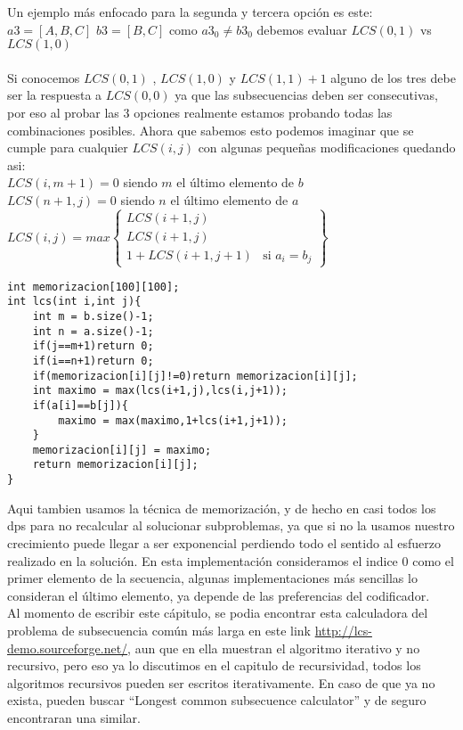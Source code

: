 Un ejemplo más enfocado para la segunda y tercera opción es este: $a3=[A,B,C]$ $b3=[B,C]$ como $a3_0 \neq b3_0$ debemos evaluar $LCS(0,1)$ vs $LCS(1,0)$
\\
\\Si conocemos $LCS(0,1)$ , $LCS(1,0)$ y $LCS(1,1) + 1$ alguno de los tres debe ser la respuesta a $LCS(0,0)$ ya que las subsecuencias deben ser consecutivas, por eso al probar las 3 opciones realmente estamos probando todas las combinaciones posibles. Ahora que sabemos esto podemos imaginar que se cumple para cualquier $LCS(i,j)$ con algunas pequeñas modificaciones quedando asi:
\\$LCS(i,m+1) = 0$ siendo $m$ el último elemento de $b$
\\$LCS(n+1,j) = 0$ siendo $n$ el último elemento de $a$
\\$LCS(i,j)= max \left\{\begin{array}{lr} LCS(i+1,j)\\LCS(i+1,j)\\1+LCS(i+1,j+1) & \text{si } a_i=b_j \end{array}\right\}$
\\\begin{minipage}{\textwidth}
\begin{lstlisting}[style=C,caption=mochila.cpp]
int memorizacion[100][100];
int lcs(int i,int j){
    int m = b.size()-1;
    int n = a.size()-1;
    if(j==m+1)return 0;
    if(i==n+1)return 0;
    if(memorizacion[i][j]!=0)return memorizacion[i][j];
    int maximo = max(lcs(i+1,j),lcs(i,j+1));
    if(a[i]==b[j]){
        maximo = max(maximo,1+lcs(i+1,j+1));
    }
    memorizacion[i][j] = maximo;
    return memorizacion[i][j];
}
\end{lstlisting}
\end{minipage}
Aqui tambien usamos la técnica de memorización, y de hecho en casi todos los dps para no recalcular al solucionar subproblemas, ya que si no la usamos nuestro crecimiento puede llegar a ser exponencial perdiendo todo el sentido al esfuerzo realizado en la solución. En esta implementación consideramos el indice $0$ como el primer elemento de la secuencia, algunas implementaciones más sencillas lo consideran el último elemento, ya depende de las preferencias del codificador.
\\Al momento de escribir este cápitulo, se podia encontrar esta calculadora del problema de subsecuencia común más larga en este link \url{http://lcs-demo.sourceforge.net/}, aun que en ella muestran el algoritmo iterativo y no recursivo, pero eso ya lo discutimos en el capitulo de recursividad, todos los algoritmos recursivos pueden ser escritos iterativamente. En caso de que ya no exista, pueden buscar ``Longest common subsecuence calculator'' y de seguro encontraran una similar.